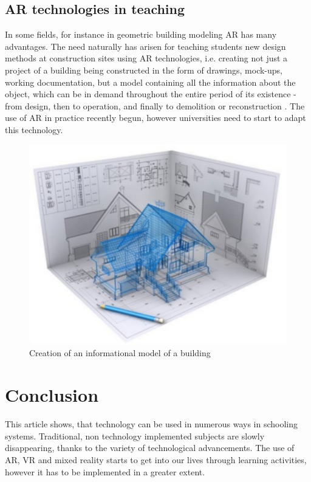 \documentclass[10pt,oneside,english,a4paper]{article}
\begin{document}
\subsection{AR technologies in teaching}\label{5.2}

	 In some fields, for instance in geometric building modeling AR has many advantages. The need naturally has arisen for teaching students new design methods at construction sites using AR technologies, i.e. creating not just a project of a building being constructed in the form of drawings, mock-ups, working documentation, but a model containing all the information about the object, which can be in demand throughout the entire period of its existence - from design, then to operation, and finally to demolition or reconstruction \cite{Tretyakova2019}. The use of AR in practice recently begun, however universities need to start to adapt this technology. 

\begin{figure}[tbh!]
\centering
\includegraphics[scale=.6]{ar_tech.pdf}
\caption{Creation of an informational model of a building\cite{Tretyakova2019}}
\label{f:rozhod}
\end{figure}

\section{Conclusion}

	This article shows, that technology can be used in numerous ways in schooling systems. Traditional, non technology implemented subjects are slowly disappearing, thanks to the variety of technological advancements. The use of AR, VR and mixed reality starts to get into our lives through learning activities, however it has to be implemented in a greater extent.






\end{document}

